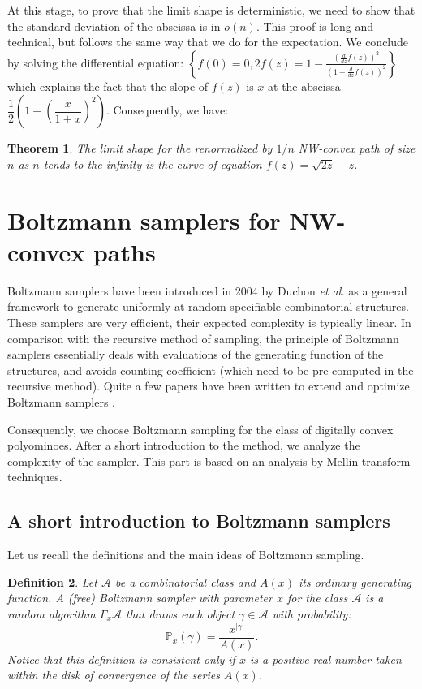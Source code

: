 \documentclass{article}
\def\cA{\mathcal{A}}
\newtheorem{theorem}{Theorem}[section]
\newtheorem{definition}[theorem]{Definition}
\begin{document}
At this stage, to prove that the limit shape is deterministic, we need to show that the standard deviation of the abscissa is in $o(n)$. 
This proof is long and technical, but follows the same way that we do for the expectation.
We conclude by solving the differential equation:
 $\left\{ f \left( 0 \right) =0,2f \left( z \right) =1-{\frac {
 \left( {\frac {d}{dz}}f \left( z \right)  \right) ^{2}}{ \left( 1+{
\frac {d}{dz}}f \left( z \right)  \right) ^{2}}} \right\} 
$ which explains the fact that the slope of $f(z)$ is $x$ at the abscissa $\dfrac1{2}\left(1-\left(\dfrac{x}{1+x}\right)^2\right).$ 
Consequently, we have:

\begin{theorem}
The limit shape for the renormalized by $1/n$ NW-convex path of size $n$ as $n$ tends to the infinity is the curve of equation $f(z) = \sqrt{2z}-z$.
\end{theorem}



\section{Boltzmann samplers for NW-convex paths}
\label{section3}

Boltzmann samplers have been introduced in 2004 by Duchon \textit{et
  al.} \cite{DuFlLoSc04} as a general framework to generate uniformly at random
specifiable combinatorial structures. These samplers are very
efficient, their expected complexity is typically linear. In comparison with the recursive method of sampling, the
principle of Boltzmann samplers essentially deals with evaluations
of the generating function of the structures, and avoids counting coefficient (which need to be pre-computed in the recursive
method). Quite a few papers have been written to extend and
optimize Boltzmann samplers
\cite{PiSaSo08,BoJa08,BoRoSo,BoPo10,BoFuKaVi,BoGaRo10,BoLu12}.

Consequently, we choose Boltzmann sampling for the class of digitally
convex polyominoes. After a short introduction to the method, we
analyze the complexity of the sampler. This part is based on an
analysis by Mellin transform techniques.


\subsection{A short introduction to Boltzmann samplers}
Let us recall the definitions and the main ideas of Boltzmann sampling.
\begin{definition}
Let $\cA$ be a combinatorial class and $A(x)$ its ordinary
generating function. A \emph{(free) Boltzmann sampler} with
parameter $x$ for the class $\cA$ is a random algorithm
$\Gamma_x\cA$ that draws each object $\gamma \in \cA$ with
probability:
\[\mathbb{P}_x (\gamma )=\frac{x^{|\gamma |}}{A(x)}.\]
Notice that this definition is consistent only if $x$ is a
positive real number taken within the disk of convergence of the
series $A(x)$.
\end{definition}
\end{document}
